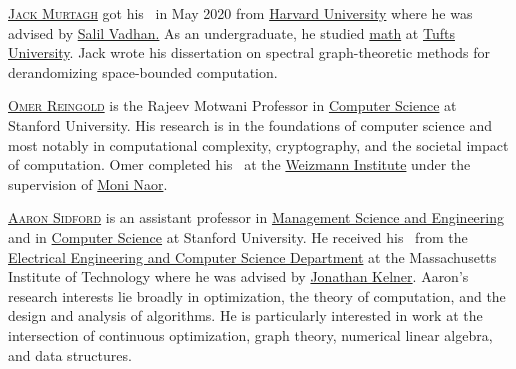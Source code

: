 \documentclass{toc}
\numberwithin{myalgctr}{section}
\theoremstyle{named}
\begin{document}
%
%
%
%
%
%
%
%
%
%
%
%
%
%

\begin{tocaboutauthors}
\begin{tocabout}[murtagh]
  \textsc{\href{https://scholar.harvard.edu/jmurtagh}{Jack Murtagh}} %
 got his \phd\ in May 2020 from \href{https://toc.seas.harvard.edu/}{Harvard University} where he was
%
advised by \href{http://salil.seas.harvard.edu}{Salil Vadhan.} As an undergraduate, he studied \href{http://math.tufts.edu/}{math} at \href{https://www.tufts.edu/}{Tufts University}. Jack wrote his dissertation on spectral graph-theoretic methods for derandomizing space-bounded computation.
\end{tocabout}


\begin{tocabout}[reingold]  
  \textsc{\href{https://engineering.stanford.edu/people/omer-reingold}{Omer Reingold}} is the Rajeev Motwani Professor in \href{https://cs.stanford.edu/}{Computer Science} at Stanford University. His research is in the foundations of computer science and most notably in computational complexity, cryptography, and the societal impact of computation. Omer completed his \phd\ at the \href{https://www.weizmann.ac.il/math/}{Weizmann Institute} under the supervision of \href{http://www.wisdom.weizmann.ac.il/~naor/}{Moni Naor}.
\end{tocabout}


\begin{tocabout}[sidford]   
  \textsc{\href{http://aaronsidford.com}{Aaron Sidford}} is an assistant professor in \href{https://msande.stanford.edu/}{Management Science and Engineering} and in \href{https://cs.stanford.edu/}{Computer Science} 
%
%
  at Stanford University. He received his \phd\ from the \href{https://www.eecs.mit.edu/}{Electrical Engineering and Computer Science Department} at the Massachusetts Institute of Technology where he was advised by \href{https://math.mit.edu/~kelner/}{Jonathan Kelner}.
%
%
%
Aaron's research interests lie broadly in optimization, the theory of computation, and the design and analysis of algorithms. He is particularly interested in work at the intersection of continuous optimization, graph theory, numerical linear algebra, and data structures. 
 \end{tocabout}



\end{tocaboutauthors}
\end{document}
